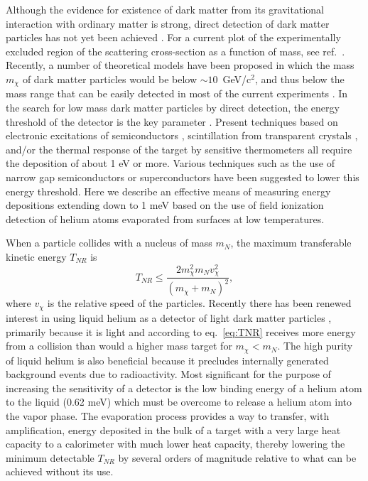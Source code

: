 \documentclass[10pt, letterpaper, reprint, superscriptaddress, aps, prl]
{revtex4-1} \usepackage[latin1]{inputenc}
\begin{document}
Although the evidence for existence of dark matter from its gravitational interaction with ordinary matter is strong, direct detection of dark matter particles has not yet been achieved \cite{schneck2015,Akerib2017}. 
For a current plot of the experimentally excluded region of the scattering cross-section as a function of mass, see ref.~\cite{Akerib2017}. 
Recently, a number of theoretical models have been proposed in which the mass $m_\chi$  of dark matter particles would be below $\sim 10$~GeV/c$^2$, and thus below the mass range that can be easily detected in most of the current experiments \cite{Cushman2013}. 
In the search for low mass dark matter particles by direct detection, the energy threshold of the detector is the key parameter \cite{Strauss2016,Angloher2016}.
Present techniques based on electronic excitations of semiconductors \cite{Agnese2014,Agnese2015,Armengaud2016,Hehn2016}, scintillation from transparent crystals \cite{Strauss2016,Angloher2016}, and/or the thermal response of the target by sensitive thermometers \cite{Agnese2014,Hehn2016,Armengaud2016,Strauss2016,Angloher2016} all require the deposition of about 1 eV or more. 
Various techniques such as the use of narrow gap semiconductors \cite{Graham2012,Essig2012} or superconductors \cite{Hochberg2016} have been suggested to lower this energy threshold.
Here we describe an effective means of measuring energy depositions extending down to 1 meV based on the use of field ionization detection of helium atoms evaporated from surfaces at low temperatures. 

When a particle collides with a nucleus of mass $m_N$, the maximum transferable kinetic energy $T_{NR}$ is
\begin{equation}
T_{NR}\leq\frac{2m_\chi^2 m_N v_\chi^2}{(m_\chi + m_N)^2},
\label{eq:TNR}
\end{equation}
where $v_\chi$ is the relative speed of the particles. 
Recently there has been renewed interest in using liquid helium as a detector of light dark matter particles \cite{Guo2013,Ito2013,Schutz2016}, primarily because it is light and according to eq.~\ref{eq:TNR} receives more energy from a collision than would a higher mass target for $m_{\chi}<m_N$.
The high purity of liquid helium is also beneficial because it precludes internally generated background events due to radioactivity. 
Most significant for the purpose of increasing the sensitivity of a detector is the low binding energy of a helium atom to the liquid (0.62 meV) which must be overcome to release a helium atom into the vapor phase. 
The evaporation process provides a way to transfer, with amplification, energy deposited in the bulk of a target with a very large heat capacity to a calorimeter with much lower heat capacity, thereby lowering the minimum detectable $T_{NR}$ by several orders of magnitude relative to what can be achieved without its use.
\end{document}
